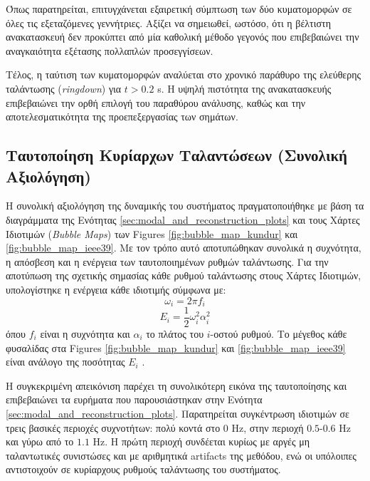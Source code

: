 \documentclass[conference]{IEEEtran}
\begin{document}
Όπως παρατηρείται, επιτυγχάνεται εξαιρετική σύμπτωση των δύο κυματομορφών σε όλες τις εξεταζόμενες γεννήτριες. Aξίζει να σημειωθεί, ωστόσο, ότι η βέλτιστη ανακατασκευή δεν προκύπτει από μία καθολική μέθοδο γεγονός που επιβεβαιώνει την αναγκαιότητα εξέτασης πολλαπλών προσεγγίσεων.

Τέλος, η ταύτιση των κυματομορφών αναλύεται στο χρονικό παράθυρο της ελεύθερης ταλάντωσης (\textit{ringdown}) για $ t> 0.2$ s. Η υψηλή πιστότητα της ανακατασκευής επιβεβαιώνει την ορθή επιλογή του παραθύρου ανάλυσης, καθώς και την αποτελεσματικότητα της προεπεξεργασίας των σημάτων.
\subsection{Ταυτοποίηση Κυρίαρχων Ταλαντώσεων (Συνολική Αξιολόγηση)}
\label{subsec:overall_evaluation}

Η συνολική αξιολόγηση της δυναμικής του συστήματος πραγματοποιήθηκε με βάση τα διαγράμματα της Ενότητας \ref{sec:modal_and_reconstruction_plots} και τους Χάρτες Ιδιοτιμών (\textit{Bubble Maps}) των Figures \ref{fig:bubble_map_kundur} και \ref{fig:bubble_map_ieee39}. Με τον τρόπο αυτό αποτυπώθηκαν συνολικά η συχνότητα, η απόσβεση και η ενέργεια των ταυτοποιημένων ρυθμών ταλάντωσης.
Για την αποτύπωση της σχετικής σημασίας κάθε ρυθμού ταλάντωσης στους Χάρτες Ιδιοτιμών, υπολογίστηκε η ενέργεια κάθε ιδιοτιμής σύμφωνα με:
\begin{equation}
\omega_i = 2\pi f_i
\end{equation}
\begin{equation}
\label{eq:pole_energy}
E_i = \frac{1}{2}\omega_i^2 \alpha_i^2
\end{equation}
όπου $f_i$ είναι η συχνότητα και $\alpha_i$ το πλάτος του $i$-οστού ρυθμού. Το μέγεθος κάθε φυσαλίδας στα Figures \ref{fig:bubble_map_kundur} και \ref{fig:bubble_map_ieee39} είναι ανάλογο της ποσότητας $E_i$ \cite{sfetkos2024measurement}.

Η συγκεκριμένη απεικόνιση παρέχει τη συνολικότερη εικόνα της ταυτοποίησης και επιβεβαιώνει τα ευρήματα που παρουσιάστηκαν στην Ενότητα \ref{sec:modal_and_reconstruction_plots}. Παρατηρείται συγκέντρωση ιδιοτιμών σε τρεις βασικές περιοχές συχνοτήτων: πολύ κοντά στο $0$ Hz, στην περιοχή $0.5$-$0.6$ Hz και γύρω από το $1.1$ Hz. Η πρώτη περιοχή συνδέεται κυρίως με αργές μη ταλαντωτικές συνιστώσες και με αριθμητικά artifacts της μεθόδου, ενώ οι υπόλοιπες αντιστοιχούν σε κυρίαρχους ρυθμούς ταλάντωσης του συστήματος. 
\end{document}
